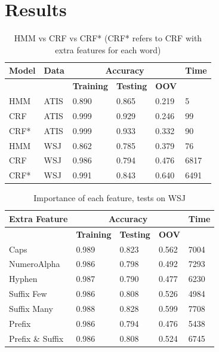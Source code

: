 \documentclass[twocolumn]{article}
\begin{document}
\section{Results}
\begin{table}[h]
\centering
  \caption{HMM vs CRF vs CRF* (CRF* refers to CRF with extra features for each word)}
  \label{tab:first}
\begin{tabular}{@{}llllll@{}}
\toprule
\textbf{Model} & \textbf{Data} & \multicolumn{3}{c}{\textbf{Accuracy}}               & \textbf{Time} \\ \midrule
               &               & \textbf{Training} & \textbf{Testing} & \textbf{OOV} &               \\ \midrule
HMM            & ATIS          & 0.890             & 0.865            & 0.219        & 5      \\ \midrule
CRF            & ATIS          & 0.999             & 0.929            & 0.246        & 99      \\ \midrule
CRF*           & ATIS          & 0.999             & 0.933            & 0.332        & 90      \\ \midrule
HMM            & WSJ           & 0.862             & 0.785            & 0.379        & 76      \\ \midrule
CRF            & WSJ           & 0.986             & 0.794            & 0.476        & 6817      \\ \midrule
CRF*           & WSJ           & 0.991             & 0.843            & 0.640       &  6491      \\ \bottomrule
\end{tabular}
\end{table}
\begin{table}[h]    
        \centering
        \caption{Importance of each feature, tests on WSJ\\}
        \label{tab:second}
\begin{tabular}{@{}lllll@{}}
\toprule
\textbf{Extra Feature} & \multicolumn{3}{c}{\textbf{Accuracy}}               & \textbf{Time} \\ \midrule
                       & \textbf{Training} & \textbf{Testing} & \textbf{OOV} &               \\ \midrule
Caps                   & 0.989             & 0.823            & 0.562        & 7004       \\ \midrule
NumeroAlpha            & 0.986             & 0.798            & 0.492        & 7293       \\ \midrule
Hyphen                 & 0.987             & 0.790            & 0.477        & 6230       \\ \midrule
Suffix Few      & 0.986             & 0.808            & 0.526        & 4984       \\ \midrule
Suffix Many       & 0.988             & 0.828            & 0.599        & 7708       \\ \midrule
Prefix                 & 0.986             & 0.794            & 0.476        & 5438       \\ \midrule
Prefix \& Suffix      & 0.986              & 0.808            & 0.524        & 6745        \\ \bottomrule
\end{tabular}
\end{table}
\end{document}
